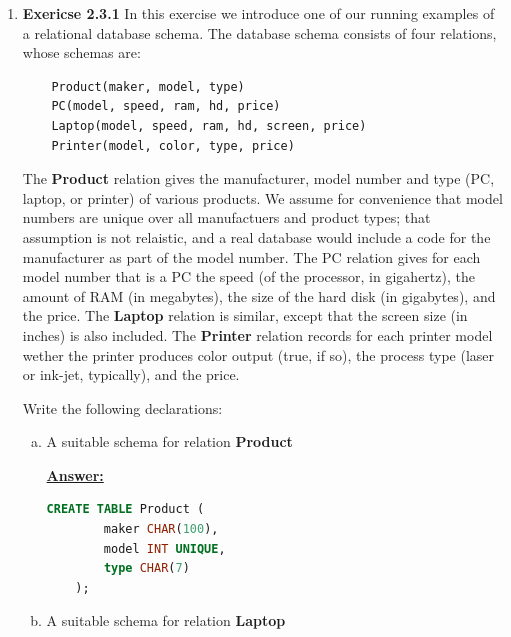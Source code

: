 \documentclass[12pt]{article}
\begin{document}
\begin{enumerate}[1.]
    \item \textbf{Exericse 2.3.1} In this exercise we introduce one of our running
    examples of a relational database schema. The database schema consists of four relations,
    whose schemas are:

    \bigskip

    \begin{lstlisting}
    Product(maker, model, type)
    PC(model, speed, ram, hd, price)
    Laptop(model, speed, ram, hd, screen, price)
    Printer(model, color, type, price)
    \end{lstlisting}

    The \textbf{Product} relation gives the manufacturer, model number and type
    (PC, laptop, or printer) of various products. We assume for convenience that
    model numbers are unique over all manufactuers and product types; that assumption is
    not relaistic, and a real database would include a code for the manufacturer
    as part of the model number. The PC relation gives for each model number that
    is a PC the speed (of the processor, in gigahertz), the amount of RAM (in megabytes),
    the size of the hard disk (in gigabytes), and the price. The \textbf{Laptop}
    relation is similar, except that the screen size (in inches) is also included. The
    \textbf{Printer} relation records for each printer model wether the printer
    produces color output (true, if so), the process type (laser or ink-jet, typically),
    and the price.

    \bigskip

    Write the following declarations:

    \begin{enumerate}[a)]
        \item A suitable schema for relation \textbf{Product}

        \begin{mdframed}
            \underline{\textbf{Answer:}}

            \bigskip

    \begin{lstlisting}[language=SQL]
    CREATE TABLE Product (
        maker CHAR(100),
        model INT UNIQUE,
        type CHAR(7)
    );
    \end{lstlisting}

        \end{mdframed}


        \item A suitable schema for relation \textbf{Laptop}


\end{enumerate}
\end{enumerate}
\end{document}
